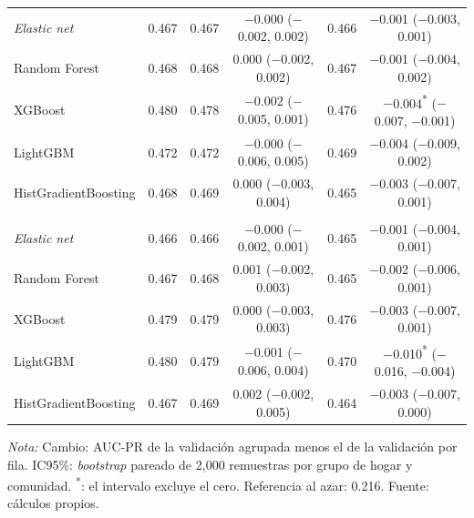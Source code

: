 \begin{table}[H]
\begin{tabular}{l c cc cc}
    \quad \emph{Elastic net} & 0.467 & 0.467 & $-$0.000 ($-$0.002, 0.002) & 0.466 & $-$0.001 ($-$0.003, 0.001) \\
    \quad Random Forest & 0.468 & 0.468 & 0.000 ($-$0.002, 0.002) & 0.467 & $-$0.001 ($-$0.004, 0.002) \\
    \quad XGBoost & 0.480 & 0.478 & $-$0.002 ($-$0.005, 0.001) & 0.476 & $-$0.004\textsuperscript{*} ($-$0.007, $-$0.001) \\
    \quad LightGBM & 0.472 & 0.472 & $-$0.000 ($-$0.006, 0.005) & 0.469 & $-$0.004 ($-$0.009, 0.002) \\
    \quad HistGradientBoosting & 0.468 & 0.469 & 0.000 ($-$0.003, 0.004) & 0.465 & $-$0.003 ($-$0.007, 0.001) \\
    \addlinespace
    \multicolumn{6}{l}{\textit{Modelo A con DMSP-OLS}} \\
    \quad \emph{Elastic net} & 0.466 & 0.466 & $-$0.000 ($-$0.002, 0.001) & 0.465 & $-$0.001 ($-$0.004, 0.001) \\
    \quad Random Forest & 0.467 & 0.468 & 0.001 ($-$0.002, 0.003) & 0.465 & $-$0.002 ($-$0.006, 0.001) \\
    \quad XGBoost & 0.479 & 0.479 & 0.000 ($-$0.003, 0.003) & 0.476 & $-$0.003 ($-$0.007, 0.001) \\
    \quad LightGBM & 0.480 & 0.479 & $-$0.001 ($-$0.006, 0.004) & 0.470 & $-$0.010\textsuperscript{*} ($-$0.016, $-$0.004) \\
    \quad HistGradientBoosting & 0.467 & 0.469 & 0.002 ($-$0.002, 0.005) & 0.464 & $-$0.003 ($-$0.007, 0.000) \\
    \bottomrule
  \end{tabular}
  \begin{minipage}{0.95\textwidth}
    \vspace{4pt}
    \footnotesize \textit{Nota:} Cambio: AUC-PR de la validación agrupada menos el
    de la validación por fila. IC95\%: \emph{bootstrap} pareado de 2{,}000
    remuestras por grupo de hogar y comunidad. \textsuperscript{*}: el intervalo
    excluye el cero. Referencia al azar: 0.216.
    Fuente: cálculos propios.
  \end{minipage}
\end{table}
